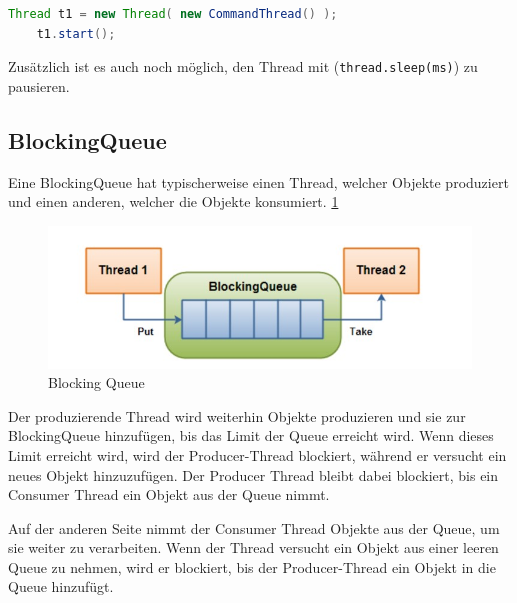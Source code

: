 \begin{lstlisting}[language=java,caption=Thread erstellen/starten,label=lst:impl:threadStart]
    Thread t1 = new Thread( new CommandThread() );
    t1.start();
\end{lstlisting}
 
Zusätzlich ist es auch noch möglich, den Thread mit (\texttt{thread.sleep(ms)}) zu pausieren. \cite{javaInselBuch}

\subsection{BlockingQueue}
 
Eine BlockingQueue hat typischerweise einen Thread, welcher Objekte produziert und einen anderen, welcher die Objekte konsumiert. \ref{fig:impl:BlockingQueue}
 
\begin{figure}[h t]
    \centering
    \includegraphics[scale=0.5]{pics/blockingQueue.jpg}
    \caption{Blocking Queue \cite{javaBlockingQueue}}
    \label{fig:impl:BlockingQueue}
\end{figure}
 
Der produzierende Thread wird weiterhin Objekte produzieren und sie zur BlockingQueue hinzufügen, bis das Limit der Queue erreicht wird. Wenn dieses Limit erreicht wird, wird der Producer-Thread blockiert, während er versucht ein neues Objekt hinzuzufügen. Der Producer Thread bleibt dabei blockiert, bis ein Consumer Thread ein Objekt aus der Queue nimmt.
 
Auf der anderen Seite nimmt der Consumer Thread Objekte aus der Queue, um sie weiter zu verarbeiten. Wenn der Thread versucht ein Objekt aus einer leeren Queue zu nehmen, wird er blockiert, bis der Producer-Thread ein Objekt in die Queue hinzufügt. \cite{javaBlockingQueue}
 
